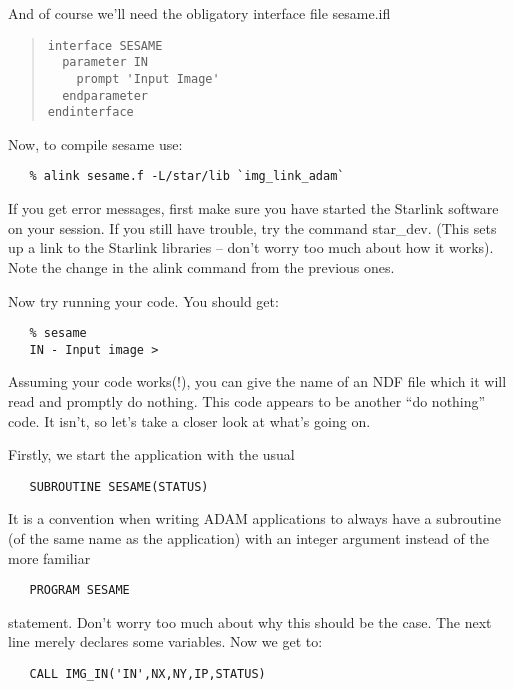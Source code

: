 And of course we'll need the obligatory interface file {\sf sesame.ifl}

\begin{quote}
{\small
\begin{verbatim}
interface SESAME
  parameter IN
    prompt 'Input Image'
  endparameter
endinterface
\end{verbatim}
}
\end{quote}

Now, to compile sesame use:

\begin{verbatim}
   % alink sesame.f -L/star/lib `img_link_adam`
\end{verbatim}

If you get error messages, first make sure you have started the Starlink
software on your session.  If you still have trouble, try the command {\sf
star\_dev}. (This sets up a link to the Starlink libraries -- don't worry too
much about how it works). Note the change in the {\sf alink} command from the
previous ones.

Now try running your code. You should get:

\begin{verbatim}
   % sesame
   IN - Input image >
\end{verbatim}

Assuming your code works(!), you can give the name of an NDF file which it
will read and promptly do nothing. This code appears to be another ``do
nothing'' code. It isn't, so let's take a closer look at what's going on.

Firstly, we start the application with the usual

\begin{verbatim}
   SUBROUTINE SESAME(STATUS)
\end{verbatim}

It is a convention when writing ADAM applications to always have
a subroutine (of the same name as the application) with
an integer argument instead of the more familiar

\begin{verbatim}
   PROGRAM SESAME
\end{verbatim}

statement. Don't worry too much about why this should be the case.
The next line merely declares some variables. Now
we get to:

\begin{verbatim}
   CALL IMG_IN('IN',NX,NY,IP,STATUS)
\end{verbatim}

